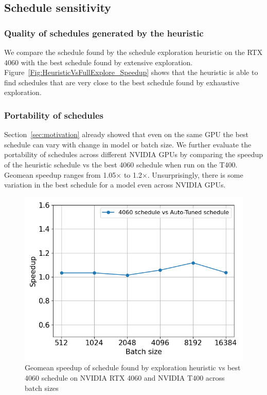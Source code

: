 \subsection{Schedule sensitivity}
\subsubsection*{Quality of schedules generated by the heuristic}
We compare the schedule found by the schedule exploration heuristic on the RTX 4060 with the best schedule found by extensive exploration. Figure~\ref{Fig:HeuristicVsFullExplore_Speedup} shows that the heuristic is able to find schedules that are very close to the best schedule found by exhaustive exploration.
\subsubsection*{Portability of schedules}
Section~\ref{sec:motivation} already showed that even on the same GPU the best schedule can vary with change in model or batch size.
We further evaluate the portability of schedules across different NVIDIA GPUs by comparing the speedup of the heuristic schedule vs the best 4060 schedule when run on the T400. Geomean speedup ranges from 1.05$\times$ to 1.2$\times$. Unsurprisingly, there is some variation in the best schedule for a model even across NVIDIA GPUs.
\begin{figure}[htb]
  \centering
  \includegraphics[width=0.75\linewidth]{figures/geomean_speedup_T400_4060_vs_T400.png}
  \caption{Geomean speedup of schedule found by exploration heuristic vs best 4060 schedule on NVIDIA RTX 4060 and NVIDIA T400 across batch sizes}
  \label{Fig:AutotuningSpeedupvs4060Sched}
\end{figure}


